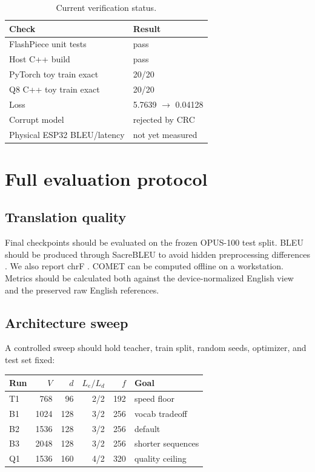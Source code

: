 \documentclass{article}
\begin{document}
\begin{table}[t]
\centering
\caption{Current verification status.}
\begin{tabular}{ll}
\toprule
Check & Result\\
\midrule
FlashPiece unit tests & pass\\
Host C++ build & pass\\
PyTorch toy train exact & 20/20\\
Q8 C++ toy train exact & 20/20\\
Loss & 5.7639 $\rightarrow$ 0.04128\\
Corrupt model & rejected by CRC\\
Physical ESP32 BLEU/latency & not yet measured\\
\bottomrule
\end{tabular}
\end{table}

\section{Full evaluation protocol}
\subsection{Translation quality}
Final checkpoints should be evaluated on the frozen OPUS-100 test split. BLEU should be produced through SacreBLEU to avoid hidden preprocessing differences \citep{post2018sacrebleu}. We also report chrF \citep{popovic2015chrf}. COMET \citep{rei2020comet} can be computed offline on a workstation. Metrics should be calculated both against the device-normalized English view and the preserved raw English references.

\subsection{Architecture sweep}
A controlled sweep should hold teacher, train split, random seeds, optimizer, and test set fixed:
\begin{table}[H]
\centering
\begin{tabular}{lrrrrl}
\toprule
Run & $V$ & $d$ & $L_e/L_d$ & $f$ & Goal\\
\midrule
T1 & 768 & 96 & 2/2 & 192 & speed floor\\
B1 & 1024 & 128 & 3/2 & 256 & vocab tradeoff\\
B2 & 1536 & 128 & 3/2 & 256 & default\\
B3 & 2048 & 128 & 3/2 & 256 & shorter sequences\\
Q1 & 1536 & 160 & 4/2 & 320 & quality ceiling\\
\bottomrule
\end{tabular}
\end{table}
\end{document}
